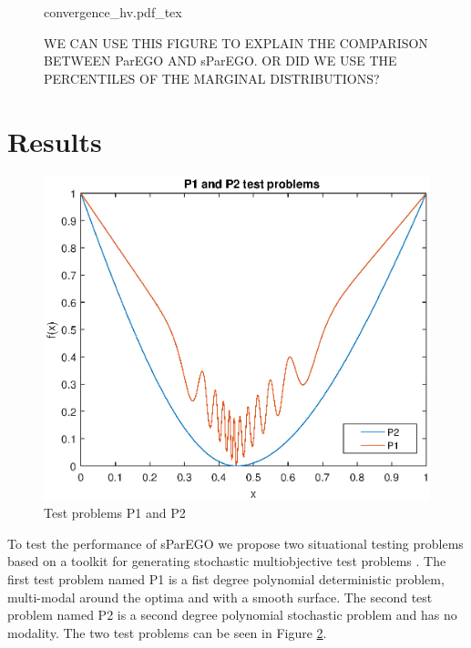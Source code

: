 \documentclass[10pt]{llncs}
\begin{document}
\begin{figure}
\centering
\def\svgwidth{0.45\textwidth}
{convergence_hv.pdf_tex}
\caption{WE CAN USE THIS FIGURE TO EXPLAIN THE COMPARISON BETWEEN ParEGO AND sParEGO. OR DID WE USE THE PERCENTILES OF THE MARGINAL DISTRIBUTIONS?}
\label{fig:convergence}
\end{figure}


\section{Results}
\label{sec:results}

\begin{figure}
\vspace{-80pt}
\begin{center}
\includegraphics[scale=0.45]{testproblems}
\end{center}
\vspace{-20pt}
\caption{Test problems P1 and P2}
\vspace{-20pt}
\label{fig:TestProblems}
\end{figure}

To test the performance of sParEGO we propose two situational testing problems based on a toolkit for generating stochastic multiobjective test problems \cite{Salomon2016Toolkit}. The first test problem named P1 is a fist degree polynomial deterministic problem, multi-modal around the optima and with a smooth surface. The second test problem named P2 is a second degree polynomial stochastic problem and has no modality. The two test problems can be seen in Figure \ref{fig:TestProblems}.  
\end{document}
